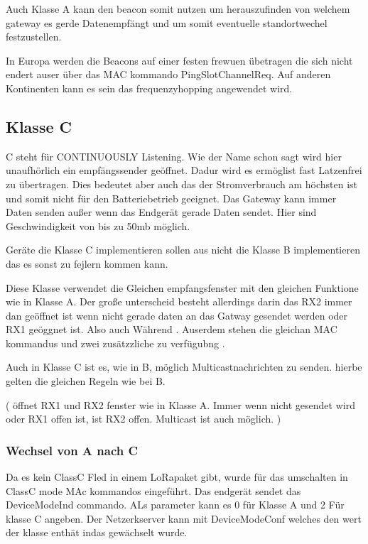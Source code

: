 \documentclass[a4paper,12pt]{article}
\begin{document}
                Auch Klasse A kann den beacon somit nutzen um herauszufinden von welchem gateway es gerde Datenempfängt und um somit eventuelle standortwechel festzustellen.
                
                In Europa werden die Beacons auf einer festen frewuen übetragen die sich nicht endert auser über das MAC kommando PingSlotChannelReq. Auf anderen Kontinenten kann es sein das frequenzyhopping angewendet wird. 
        \subsection{Klasse C}
            C steht für CONTINUOUSLY Listening. Wie der Name schon sagt wird hier unaufhörlich ein empfängssender geöffnet. Dadur wird es ermöglist fast Latzenfrei zu übertragen. Dies bedeutet aber auch das der Stromverbrauch am höchsten ist und somit nicht für den Batteriebetrieb geeignet.
            Das Gateway kann immer Daten senden außer wenn das Endgerät gerade Daten sendet. Hier sind Geschwindigkeit von bis zu 50mb möglich.
            
            Geräte die Klasse C implementieren sollen aus nicht die Klasse B implementieren das es sonst zu fejlern kommen kann.
            
            Diese Klasse verwendet die Gleichen empfangsfenster mit den gleichen Funktione wie in Klasse A. Der große unterscheid besteht allerdings darin das RX2 immer dan geöffnet ist wenn nicht gerade daten an das Gatway gesendet werden oder RX1 geöggnet ist. Also auch Während .
            Auserdem stehen die gleichan MAC kommandus und zwei zusätzzliche zu verfügubng .

            Auch in Klasse C ist es, wie in B, möglich Multicastnachrichten zu senden. hierbe gelten die gleichen Regeln wie bei B.
            
            \cite{LoRaSpec}(
                öffnet RX1 und RX2 fenster wie in Klasse A. Immer wenn  nicht gesendet wird oder RX1 offen ist, ist RX2 offen. Multicast ist auch möglich.
            )
            \subsubsection{Wechsel von A nach C}
                Da es kein ClassC Fled in einem LoRapaket gibt, wurde für das umschalten in ClassC mode MAc kommandos eingeführt. Das endgerät sendet das DeviceModeInd commando. ALs parameter kann es 0 für Klasse A und 2 Für klasse C angeben. Der Netzerkserver kann mit DeviceModeConf welches den wert der klasse enthät indas gewächselt wurde.
\end{document}
